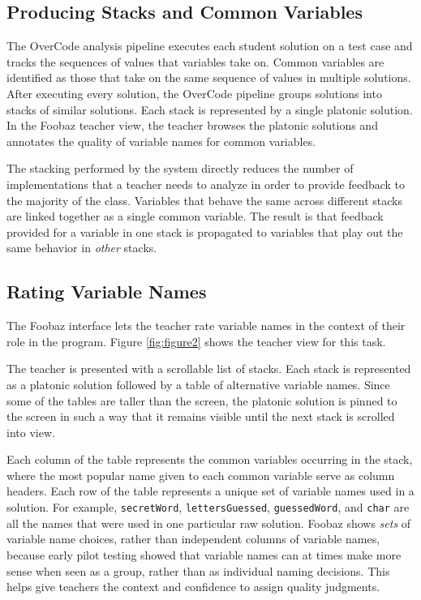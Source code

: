 \subsection{Producing Stacks and Common Variables}
The OverCode analysis pipeline executes each student solution on a test case and tracks the sequences of values that variables take on. Common variables are identified as those that take on the same sequence of values in multiple solutions. After executing every solution, the OverCode pipeline groups solutions into stacks of similar solutions. Each stack is represented by a single platonic solution. In the Foobaz teacher view, the teacher browses the platonic solutions and annotates the quality of variable names for common variables. 

The stacking performed by the system directly reduces the number of implementations that a teacher needs to analyze in order to provide feedback to the majority of the class. Variables that behave the same across different stacks are linked together as a single common variable. The result is that feedback provided for a variable in one stack is propagated to variables that play out the same behavior in \emph{other} stacks.

\subsection{Rating Variable Names}

The Foobaz interface lets the teacher rate variable names in the context of their role in the program. Figure \ref{fig:figure2} shows the teacher view for this task. 

The teacher is presented with a scrollable list of stacks. Each stack is represented as a platonic solution followed by a table of alternative variable names. Since some of the tables are taller than the screen, the platonic solution is pinned to the screen in such a way that it remains visible until the next stack is scrolled into view.

Each column of the table represents the common variables occurring in the stack, where the most popular name given to each common variable serve as column headers. Each row of the table represents a unique set of variable names used in a solution. For example, \texttt{secretWord}, \texttt{lettersGuessed}, \texttt{guessedWord}, and \texttt{char} are all the names that were used in one particular raw solution. Foobaz shows \emph{sets} of variable name choices, rather than independent columns of variable names, because early pilot testing showed that variable names can at times make more sense when seen as a group, rather than as individual naming decisions. This helps give teachers the context and confidence to assign quality judgments.

